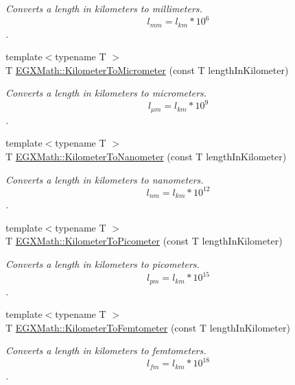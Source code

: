 \begin{DoxyCompactItemize}
\begin{DoxyCompactList}\small\item\em Converts a length in kilometers to millimeters. \[ l_{mm}=l_{km} * 10^{6} \]. \end{DoxyCompactList}\item 
{\footnotesize template$<$typename T $>$ }\\T \mbox{\hyperlink{group___e_g_x_math-_conversions-_length_conversions-_s_i-_kilometer-_s_i_ga345d16c72fcb96ff1dc3b7f290b94c94}{E\+G\+X\+Math\+::\+Kilometer\+To\+Micrometer}} (const T length\+In\+Kilometer)
\begin{DoxyCompactList}\small\item\em Converts a length in kilometers to micrometers. \[ l_{\mu m}=l_{km} * 10^{9} \]. \end{DoxyCompactList}\item 
{\footnotesize template$<$typename T $>$ }\\T \mbox{\hyperlink{group___e_g_x_math-_conversions-_length_conversions-_s_i-_kilometer-_s_i_gaa2272319841906222fd95dc1c3e90549}{E\+G\+X\+Math\+::\+Kilometer\+To\+Nanometer}} (const T length\+In\+Kilometer)
\begin{DoxyCompactList}\small\item\em Converts a length in kilometers to nanometers. \[ l_{nm}=l_{km} * 10^{12} \]. \end{DoxyCompactList}\item 
{\footnotesize template$<$typename T $>$ }\\T \mbox{\hyperlink{group___e_g_x_math-_conversions-_length_conversions-_s_i-_kilometer-_s_i_ga73f6e033de3c41892f06cde1862f68d6}{E\+G\+X\+Math\+::\+Kilometer\+To\+Picometer}} (const T length\+In\+Kilometer)
\begin{DoxyCompactList}\small\item\em Converts a length in kilometers to picometers. \[ l_{pm}=l_{km} * 10^{15} \]. \end{DoxyCompactList}\item 
{\footnotesize template$<$typename T $>$ }\\T \mbox{\hyperlink{group___e_g_x_math-_conversions-_length_conversions-_s_i-_kilometer-_s_i_ga74e9c4726fddf2091c1d687e7c5f4b37}{E\+G\+X\+Math\+::\+Kilometer\+To\+Femtometer}} (const T length\+In\+Kilometer)
\begin{DoxyCompactList}\small\item\em Converts a length in kilometers to femtometers. \[ l_{fm}=l_{km} * 10^{18} \]. \end{DoxyCompactList}\item 

\end{DoxyCompactItemize}
